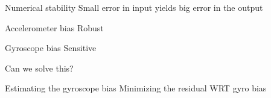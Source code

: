 \documentclass{beamer}
\begin{document}
\begin{frame}{Numerical stability}
Small error in input yields big error in the output
\end{frame}
\begin{frame}{Accelerometer bias}
Robust
\end{frame}
\begin{frame}{Gyroscope bias}
Sensitive

Can we solve this?
\end{frame}

\begin{frame}{Estimating the gyroscope bias}
Minimizing the residual WRT gyro bias
\end{frame}



\end{document}
